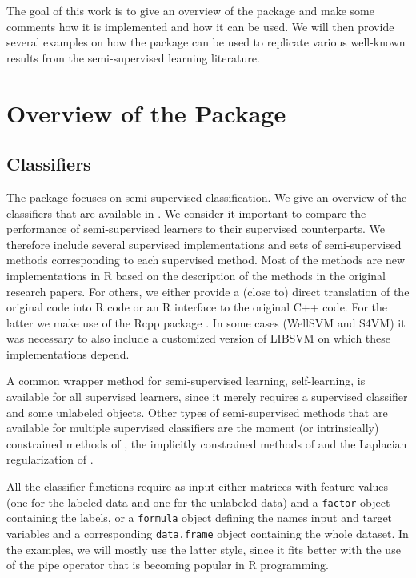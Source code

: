 \documentclass[twoside]{memoir}\usepackage[]{graphicx}\usepackage{xcolor}
\renewcommand{\cite}{\citep}
\begin{document}
The goal of this work is to give an overview of the package and make some comments how it is implemented and how it can be used. We will then provide several examples on how the package can be used to replicate various well-known results from the semi-supervised learning literature.

\section{Overview of the Package}

\subsection{Classifiers}
The package focuses on semi-supervised classification. We give an overview of the classifiers that are available in . We consider it important to compare the performance of semi-supervised learners to their supervised counterparts. We therefore include several supervised implementations and sets of semi-supervised methods corresponding to each supervised method. Most of the methods are new implementations in R based on the description of the methods in the original research papers. For others, we either provide a (close to) direct translation of the original code into R code or an R interface to the original C++ code. For the latter we make use of the Rcpp package \cite{Eddelbuettel2011}. In some cases (WellSVM and S4VM) it was necessary to also include a customized version of LIBSVM \cite{Chang2011} on which these implementations depend.

A common wrapper method for semi-supervised learning, self-learning, is available for all supervised learners, since it merely requires a supervised classifier and some unlabeled objects. Other types of semi-supervised methods that are available for multiple supervised classifiers are the moment (or intrinsically) constrained methods of \citet{Loog2010,Loog2014a}, the implicitly constrained methods of \citet{Krijthe2014,Krijthe2017,Krijthe2017projection} and the Laplacian regularization of \citet{Belkin2006}.

All the classifier functions require as input either matrices with feature values (one for the labeled data and one for the unlabeled data) and a \texttt{factor} object containing the labels, or a \texttt{formula} object defining the names input and target variables and a corresponding \texttt{data.frame} object containing the whole dataset. In the examples, we will mostly use the latter style, since it fits better with the use of the pipe operator that is becoming popular in R programming.
\end{document}
